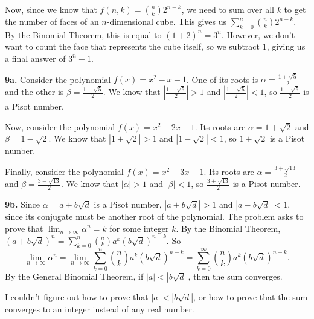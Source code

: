 \documentclass{article}
\begin{document}
Now, since we know that $f(n, k) = {n\choose k}2^{n - k}$, we need to sum over all $k$ to get the number of faces of an $n$-dimensional cube. This gives us $\sum_{k = 0}^n{n\choose k}2^{n - k}$. By the Binomial Theorem, this is equal to $(1 + 2)^n = 3^n$. However, we don't want to count the face that represents the cube itself, so we subtract $1$, giving us a final answer of $3^n - 1$.
\newline

\textbf{9a.} Consider the polynomial $f(x) = x^2 - x - 1$. One of its roots is $\alpha = \frac{1 + \sqrt{5}}{2}$ and the other is $\beta = \frac{1 - \sqrt{5}}{2}$. We know that $|\frac{1 + \sqrt{5}}{2}| > 1$ and $|\frac{1 - \sqrt{5}}{2}| < 1$, so $\frac{1 + \sqrt{5}}{2}$ is a Pisot number.
\newline

Now, consider the polynomial $f(x) = x^2 - 2x - 1$. Its roots are $\alpha = 1 + \sqrt{2}$ and $\beta = 1 - \sqrt{2}$. We know that $|1 + \sqrt{2}| > 1$ and $|1 - \sqrt{2}| < 1$, so $1 + \sqrt{2}$ is a Pisot number.
\newline

Finally, consider the polynomial $f(x) = x^2 - 3x - 1$. Its roots are $\alpha = \frac{3 + \sqrt{13}}{2}$ and $\beta = \frac{3 - \sqrt{13}}{2}$. We know that $|\alpha| > 1$ and $|\beta| < 1$, so $\frac{3 + \sqrt{13}}{2}$ is a Pisot number.
\newline

\textbf{9b.} Since $\alpha = a + b\sqrt{d}$ is a Pisot number, $|a + b\sqrt{d}| > 1$ and $|a - b\sqrt{d}| < 1$, since its conjugate must be another root of the polynomial. The problem asks to prove that $\displaystyle \lim_{n \rightarrow \infty} \alpha^n = k$ for some integer $k$. By the Binomial Theorem, $(a + b\sqrt{d})^n = \sum_{k = 0}^n {n\choose k}a^k(b\sqrt{d})^{n - k}$. So $$\lim_{n \rightarrow \infty} \alpha^n = \lim_{n \rightarrow \infty} \sum_{k = 0}^n {n\choose k}a^k(b\sqrt{d})^{n - k} = \sum_{k = 0}^\infty {n\choose k}a^k(b\sqrt{d})^{n - k}.$$ By the General Binomial Theorem, if $|a| < |b\sqrt{d}|$, then the sum converges.
\newline

I couldn't figure out how to prove that $|a| < |b\sqrt{d}|$, or how to prove that the sum converges to an integer instead of any real number.
\end{document}
